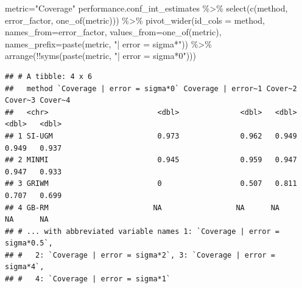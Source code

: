 \documentclass[
]{article}
\newenvironment{Shaded}{\begin{snugshade}}{\end{snugshade}}
\newcommand{\AttributeTok}[1]{\textcolor[rgb]{0.77,0.63,0.00}{#1}}
\newcommand{\FunctionTok}[1]{\textcolor[rgb]{0.00,0.00,0.00}{#1}}
\newcommand{\NormalTok}[1]{#1}
\newcommand{\OtherTok}[1]{\textcolor[rgb]{0.56,0.35,0.01}{#1}}
\newcommand{\SpecialCharTok}[1]{\textcolor[rgb]{0.00,0.00,0.00}{#1}}
\newcommand{\StringTok}[1]{\textcolor[rgb]{0.31,0.60,0.02}{#1}}
\begin{document}
\begin{Shaded}
\begin{Highlighting}[]
\NormalTok{metric}\OtherTok{=}\StringTok{"Coverage"}
\NormalTok{performance.conf\_int\_estimates }\SpecialCharTok{\%\textgreater{}\%}
    \FunctionTok{select}\NormalTok{(}\FunctionTok{c}\NormalTok{(method, error\_factor, }\FunctionTok{one\_of}\NormalTok{(metric))) }\SpecialCharTok{\%\textgreater{}\%}
    \FunctionTok{pivot\_wider}\NormalTok{(}\AttributeTok{id\_cols =}\NormalTok{ method,}
              \AttributeTok{names\_from=}\NormalTok{error\_factor,}
              \AttributeTok{values\_from=}\FunctionTok{one\_of}\NormalTok{(metric),}
              \AttributeTok{names\_prefix=}\FunctionTok{paste}\NormalTok{(metric, }\StringTok{"| error = sigma*"}\NormalTok{)) }\SpecialCharTok{\%\textgreater{}\%}
    \FunctionTok{arrange}\NormalTok{(}\SpecialCharTok{!!}\FunctionTok{syms}\NormalTok{(}\FunctionTok{paste}\NormalTok{(metric, }\StringTok{"| error = sigma*0"}\NormalTok{)))}
\end{Highlighting}
\end{Shaded}

\begin{verbatim}
## # A tibble: 4 x 6
##   method `Coverage | error = sigma*0` Coverage | error~1 Cover~2 Cover~3 Cover~4
##   <chr>                         <dbl>              <dbl>   <dbl>   <dbl>   <dbl>
## 1 SI-UGM                        0.973              0.962   0.949   0.949   0.937
## 2 MINMI                         0.945              0.959   0.947   0.947   0.933
## 3 GRIWM                         0                  0.507   0.811   0.707   0.699
## 4 GB-RM                        NA                 NA      NA      NA      NA    
## # ... with abbreviated variable names 1: `Coverage | error = sigma*0.5`,
## #   2: `Coverage | error = sigma*2`, 3: `Coverage | error = sigma*4`,
## #   4: `Coverage | error = sigma*1`
\end{verbatim}
\end{document}
